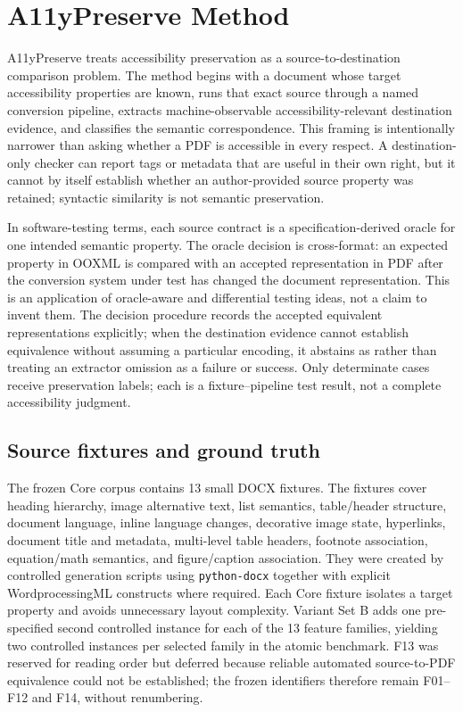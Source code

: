 \section{A11yPreserve Method}
\label{sec:method}

A11yPreserve treats accessibility preservation as a source-to-destination comparison problem. The method begins with a document whose target accessibility properties are known, runs that exact source through a named conversion pipeline, extracts machine-observable accessibility-relevant destination evidence, and classifies the semantic correspondence. This framing is intentionally narrower than asking whether a PDF is accessible in every respect. A destination-only checker can report tags or metadata that are useful in their own right, but it cannot by itself establish whether an author-provided source property was retained; syntactic similarity is not semantic preservation.

In software-testing terms, each source contract is a specification-derived oracle for one intended semantic property. The oracle decision is cross-format: an expected property in OOXML is compared with an accepted representation in PDF after the conversion system under test has changed the document representation. This is an application of oracle-aware and differential testing ideas, not a claim to invent them. The decision procedure records the accepted equivalent representations explicitly; when the destination evidence cannot establish equivalence without assuming a particular encoding, it abstains as \unresolved{} rather than treating an extractor omission as a failure or success. Only determinate cases receive preservation labels; each is a fixture--pipeline test result, not a complete accessibility judgment.

\subsection{Source fixtures and ground truth}

The frozen Core corpus contains 13 small DOCX fixtures. The fixtures cover heading hierarchy, image alternative text, list semantics, table/header structure, document language, inline language changes, decorative image state, hyperlinks, document title and metadata, multi-level table headers, footnote association, equation/math semantics, and figure/caption association. They were created by controlled generation scripts using \texttt{python-docx} together with explicit WordprocessingML constructs where required. Each Core fixture isolates a target property and avoids unnecessary layout complexity. Variant Set B adds one pre-specified second controlled instance for each of the 13 feature families, yielding two controlled instances per selected family in the atomic benchmark. F13 was reserved for reading order but deferred because reliable automated source-to-PDF equivalence could not be established; the frozen identifiers therefore remain F01--F12 and F14, without renumbering.


